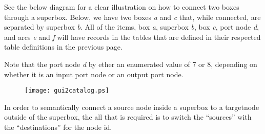 \documentclass[a4paper,12pt]{article}
\begin{document}
See the below diagram for a clear illustration on how to connect two boxes through a superbox.  Below, we have two boxes \textit{a} and \textit{c} that, while connected, are separated by superbox \textit{b}.  All of the items, box \textit{a}, superbox \textit{b}, box \textit{c}, port node \textit{d}, and arcs \textit{e} and \textit{f} will have records in the tables that are defined in their respected table definitions in the previous page.

Note that the port node \textit{d} by ether an enumerated value of 7 or 8, depending on whether it is an input port node or an output port node.

\begin{figure}[ht]
\texttt{[image: gui2catalog.ps]}
\end{figure}

In order to semantically connect a source node inside a superbox to a targetnode outside of the superbox, the all that is required is to switch the ``sources'' with the ``destinations'' for the node id.
\end{document}
